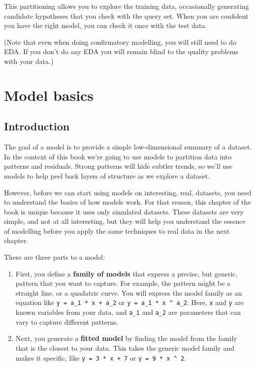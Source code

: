 \documentclass[]{book}
\begin{document}
This partitioning allows you to explore the training data, occasionally
generating candidate hypotheses that you check with the query set. When
you are confident you have the right model, you can check it once with
the test data.

(Note that even when doing confirmatory modelling, you will still need
to do EDA. If you don't do any EDA you will remain blind to the quality
problems with your data.)

\hypertarget{model-basics}{\chapter{Model basics}\label{model-basics}}

\section{Introduction}\label{introduction-15}

The goal of a model is to provide a simple low-dimensional summary of a
dataset. In the context of this book we're going to use models to
partition data into patterns and residuals. Strong patterns will hide
subtler trends, so we'll use models to help peel back layers of
structure as we explore a dataset.

However, before we can start using models on interesting, real,
datasets, you need to understand the basics of how models work. For that
reason, this chapter of the book is unique because it uses only
simulated datasets. These datasets are very simple, and not at all
interesting, but they will help you understand the essence of modelling
before you apply the same techniques to real data in the next chapter.

There are three parts to a model:

\begin{enumerate}
\def\labelenumi{\arabic{enumi}.}
\item
  First, you define a \textbf{family of models} that express a precise,
  but generic, pattern that you want to capture. For example, the
  pattern might be a straight line, or a quadatric curve. You will
  express the model family as an equation like
  \texttt{y\ =\ a\_1\ *\ x\ +\ a\_2} or
  \texttt{y\ =\ a\_1\ *\ x\ \^{}\ a\_2}. Here, \texttt{x} and \texttt{y}
  are known variables from your data, and \texttt{a\_1} and
  \texttt{a\_2} are parameters that can vary to capture different
  patterns.
\item
  Next, you generate a \textbf{fitted model} by finding the model from
  the family that is the closest to your data. This takes the generic
  model family and makes it specific, like \texttt{y\ =\ 3\ *\ x\ +\ 7}
  or \texttt{y\ =\ 9\ *\ x\ \^{}\ 2}.
\end{enumerate}
\end{document}
